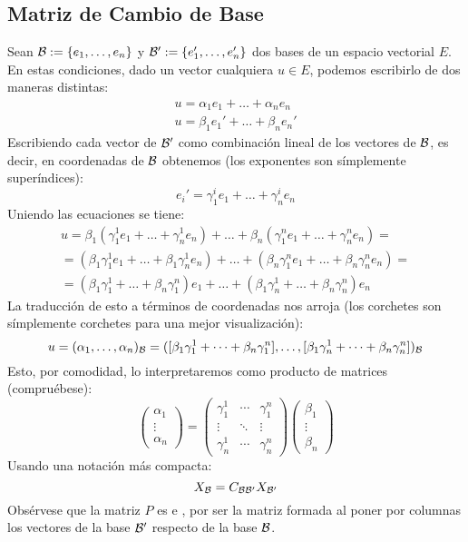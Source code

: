 \subsection{Matriz de Cambio de Base}
\label{A1_cambioBase}
Sean $\mathcal{B}:=\{e_1,\dots,e_n\}$ y $\mathcal{B}':=\{e_1',\dots,e_n'\}$ dos bases de un espacio vectorial $E$.
En estas condiciones, dado un vector cualquiera $u\in E$, podemos escribirlo de dos maneras distintas:
\begin{gather}
	u=\alpha_1e_1+\dots+\alpha_ne_n\\
	\label{A1_eq_escritura2}
	u=\beta_1e_1'+\dots+\beta_ne_n'
\end{gather}
Escribiendo cada vector de $\mathcal{B}'$ como combinación lineal de los vectores de $\mathcal{B}$, es decir, en coordenadas de $\mathcal{B}$ obtenemos (los exponentes son símplemente superíndices):
\begin{equation}
	e_i'=\gamma_1^ie_1+\dots+\gamma_n^ie_n
\end{equation}
Uniendo las ecuaciones se tiene:
\begin{multline}
	u=\beta_1(\gamma_1^1e_1+\dots+\gamma_n^1e_n)+\dots+\beta_n(\gamma_1^ne_1+\dots+\gamma_n^ne_n)=\\
	=(\beta_1\gamma_1^1e_1+\dots+\beta_1\gamma_n^1e_n)+\dots+(\beta_n\gamma_1^ne_1+\dots+\beta_n\gamma_n^ne_n)=\\
	=(\beta_1\gamma_1^1+\dots+\beta_n\gamma_1^n)e_1+\dots+(\beta_1\gamma_n^1+\dots+\beta_n\gamma_n^n)e_n
\end{multline}
La traducción de esto a términos de coordenadas nos arroja (los corchetes son símplemente corchetes para una mejor visualización):
\begin{equation}
	u=(\alpha_1,\dots,\alpha_n)_{\mathcal{B}}=([\beta_1\gamma_1^1+\dots+\beta_n\gamma_1^n],\dots,[\beta_1\gamma_n^1+\dots+\beta_n\gamma_n^n])_{\mathcal{B}}
\end{equation}
Esto, por comodidad, lo interpretaremos como producto de matrices (compruébese):
\begin{equation}
	\begin{pmatrix}
	\alpha_1\\
	\vdots\\
	\alpha_n
	\end{pmatrix}=
	\begin{pmatrix}
	\gamma_1^1 & \cdots & \gamma_1^n\\
	\vdots & \ddots & \vdots\\
	\gamma_n^1 & \cdots & \gamma_n^n
	\end{pmatrix}
	\begin{pmatrix}
	\beta_1\\
	\vdots\\
	\beta_n
	\end{pmatrix}
\end{equation}
Usando una notación más compacta:
\begin{equation}
	X_{\mathcal{B}}=C_{\mathcal{B}\mathcal{B}'}X_{\mathcal{B}'}
\end{equation}
Obsérvese que la matriz $P$ es  e , por ser la matriz formada al poner por columnas los vectores de la base $\mathcal{B}'$ respecto de la base $\mathcal{B}$.

